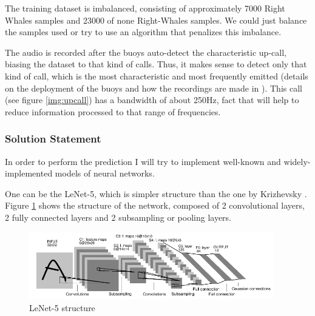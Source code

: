 \documentclass[]{article}
\begin{document}
The training dataset is imbalanced, consisting of approximately 7000 Right Whales samples and 23000 of none Right-Whales samples. We could just balance the samples used or try to use an algorithm that penalizes this imbalance.

The audio is recorded after the buoys auto-detect the characteristic up-call, biasing the dataset to that kind of calls. Thus, it makes sense to detect only that kind of call, which is the most characteristic and most frequently emitted (details on the deployment of the buoys and how the recordings are made in \cite{McDonald2002}). This call (see figure \ref{img:upcall}) has a bandwidth of about 250Hz, fact that will help to reduce information processed to that range of frequencies.



\subsubsection{Solution Statement}\label{solution-statement}

In order to perform the prediction I will try to implement well-known and widely-implemented models of neural networks.

One can be the LeNet-5, which is simpler structure than the one by Krizhevsky \cite{Krizhevsky12}. Figure \ref{img:lenet5} shows the structure of the network, composed of 2 convolutional layers, 2 fully connected layers and 2 subsampling or pooling layers.
\begin{figure}[htpb!]
\centering
\includegraphics[width= 0.95\textwidth]{images/lenet5}
\caption{LeNet-5 structure \cite{Lecun98} \label{img:lenet5}}
\end{figure}
\end{document}
